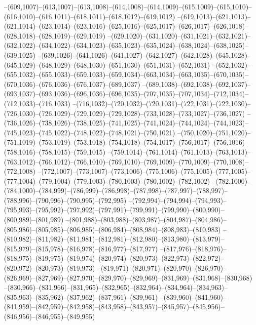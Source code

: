 --(609,1007)--(613,1007)--(613,1008)--(614,1008)--(614,1009)--(615,1009)--(615,1010)--(616,1010)--(616,1011)--(618,1011)--(618,1012)--(619,1012)
--(619,1013)--(621,1013)--(621,1014)--(623,1014)--(623,1016)--(625,1016)--(625,1017)--(626,1017)--(626,1018)--(628,1018)--(628,1019)--(629,1019)
--(629,1020)--(631,1020)--(631,1021)--(632,1021)--(632,1022)--(634,1022)--(634,1023)--(635,1023)--(635,1024)--(638,1024)--(638,1025)--(639,1025)
--(639,1026)--(641,1026)--(641,1027)--(642,1027)--(642,1028)--(645,1028)--(645,1029)--(648,1029)--(648,1030)--(651,1030)--(651,1031)--(652,1031)
--(652,1032)--(655,1032)--(655,1033)--(659,1033)--(659,1034)--(663,1034)--(663,1035)--(670,1035)--(670,1036)--(676,1036)--(676,1037)--(689,1037)
--(689,1038)--(692,1038)--(692,1037)--(693,1037)--(693,1036)--(696,1036)--(696,1035)--(707,1035)--(707,1034)--(712,1034)--(712,1033)--(716,1033)
--(716,1032)--(720,1032)--(720,1031)--(722,1031)--(722,1030)--(726,1030)--(726,1029)--(729,1029)--(729,1028)--(733,1028)--(733,1027)--(736,1027)
--(736,1026)--(738,1026)--(738,1025)--(741,1025)--(741,1024)--(744,1024)--(744,1023)--(745,1023)--(745,1022)--(748,1022)--(748,1021)--(750,1021)
--(750,1020)--(751,1020)--(751,1019)--(753,1019)--(753,1018)--(754,1018)--(754,1017)--(756,1017)--(756,1016)--(758,1016)--(758,1015)--(759,1015)
--(759,1014)--(761,1014)--(761,1013)--(763,1013)--(763,1012)--(766,1012)--(766,1010)--(769,1010)--(769,1009)--(770,1009)--(770,1008)--(772,1008)
--(772,1007)--(773,1007)--(773,1006)--(775,1006)--(775,1005)--(777,1005)--(777,1004)--(779,1004)--(779,1003)--(780,1003)--(780,1002)--(782,1002)
--(782,1000)--(784,1000)--(784,999)--(786,999)--(786,998)--(787,998)--(787,997)--(788,997)--(788,996)--(790,996)--(790,995)--(792,995)
--(792,994)--(794,994)--(794,993)--(795,993)--(795,992)--(797,992)--(797,991)--(799,991)--(799,990)--(800,990)--(800,989)--(801,989)
--(801,988)--(803,988)--(803,987)--(804,987)--(804,986)--(805,986)--(805,985)--(806,985)--(806,984)--(808,984)--(808,983)--(810,983)
--(810,982)--(811,982)--(811,981)--(812,981)--(812,980)--(813,980)--(813,979)--(815,979)--(815,978)--(816,978)--(816,977)--(817,977)
--(817,976)--(818,976)--(818,975)--(819,975)--(819,974)--(820,974)--(820,973)--(822,973)--(822,972)--(820,972)--(820,973)--(819,973)
--(819,971)--(820,971)--(820,970)--(826,970)--(826,969)--(827,969)--(827,970)--(829,970)--(829,969)--(831,969)--(831,968)--(830,968)
--(830,966)--(831,966)--(831,965)--(832,965)--(832,964)--(834,964)--(834,963)--(835,963)--(835,962)--(837,962)--(837,961)--(839,961)
--(839,960)--(841,960)--(841,959)--(842,959)--(842,958)--(843,958)--(843,957)--(845,957)--(845,956)--(846,956)--(846,955)--(849,955)
